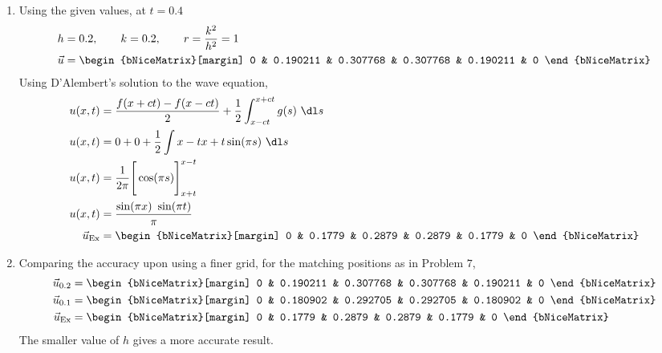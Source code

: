 \begin{enumerate}
    \item Using the given values, at $ t = 0.4 $
          \begin{align}
              h       & = 0.2, \qquad k = 0.2, \qquad
              r = \frac{k^2}{h^2} = 1                                       \\
              \vec{u} & = \begin{bNiceMatrix}[margin]
                              0 & 0.190211 & 0.307768 & 0.307768 & 0.190211 & 0
                          \end{bNiceMatrix}
          \end{align}
          Using D'Alembert's solution to the wave equation,
          \begin{align}
              u(x,t)  & = \frac{f(x+ct) - f(x-ct)}{2} + \frac{1}{2} \int_{x-ct}^{x+ct}
              g(s) \ \dl s                                                             \\
              u(x, t) & = 0 + 0 + \frac{1}{2} \int{x-t}{x+t} \sin(\pi s)\ \dl s        \\
              u(x, t) & = \frac{1}{2\pi} \Bigg[ \cos(\pi s) \Bigg]_{x+t}^{x-t}         \\
              u(x, t) & = \frac{\sin(\pi x)\ \sin(\pi t)}{\pi}                         \\
              \vec{u}_{\text{Ex}}
                      & = \begin{bNiceMatrix}[margin]
                              0 & 0.1779 & 0.2879 & 0.2879 & 0.1779 & 0
                          \end{bNiceMatrix}
          \end{align}

    \item Comparing the accuracy upon using a finer grid, for the matching
          positions as in Problem $ 7 $,
          \begin{align}
              \vec{u}_{0.2} & = \begin{bNiceMatrix}[margin]
                                    0 & 0.190211 & 0.307768 & 0.307768 & 0.190211 & 0
                                \end{bNiceMatrix} \\
              \vec{u}_{0.1} & = \begin{bNiceMatrix}[margin]
                                    0 & 0.180902 & 0.292705 & 0.292705 & 0.180902 & 0
                                \end{bNiceMatrix} \\
              \vec{u}_{\text{Ex}}
                            & = \begin{bNiceMatrix}[margin]
                                    0 & 0.1779 & 0.2879 & 0.2879 & 0.1779 & 0
                                \end{bNiceMatrix}
          \end{align}
          The smaller value of $ h $ gives a more accurate result.


\end{enumerate}
